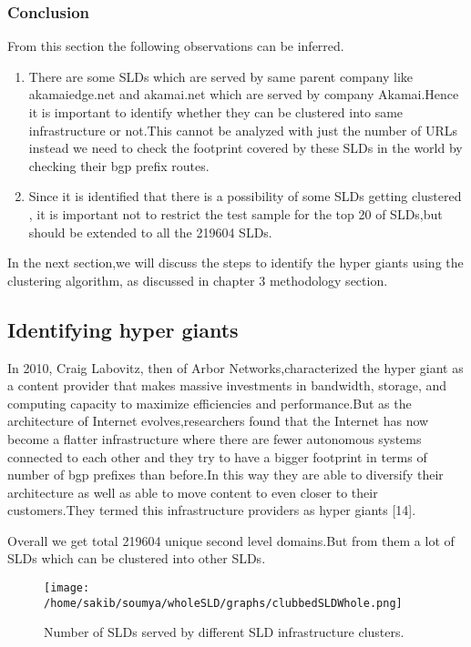 \subsubsection{Conclusion}
From this section the following observations can be inferred.
\begin{enumerate}
\item There are some SLDs which are served by same parent company like akamaiedge.net and akamai.net which are served by company Akamai.Hence it is important to identify whether they can be clustered into same infrastructure or not.This cannot be analyzed with just the number of URLs instead we need to check the footprint covered by these SLDs in the world by checking their bgp prefix routes. 
\item Since it is identified that there is a possibility of some SLDs getting clustered , it is important not to restrict the test sample for the top 20 of SLDs,but should be extended to all the 219604 SLDs.
\end{enumerate}
In the next section,we will discuss the steps to identify the hyper giants using the clustering algorithm, as discussed in chapter 3 methodology section.
\subsection{Identifying hyper giants}
In 2010, Craig Labovitz, then of Arbor Networks,characterized the hyper giant as a content provider that makes massive investments in bandwidth, storage, and computing capacity to maximize efficiencies and performance.But as the architecture of Internet evolves,researchers found that the Internet has now become a flatter infrastructure where there are fewer autonomous systems connected to each other and they try to have a bigger footprint in terms of number of bgp prefixes than before.In this way they are able to diversify their architecture as well as able to move content to even closer to their customers.They termed this infrastructure providers as hyper giants [14].

Overall we get total 219604 unique second level domains.But from them a lot of SLDs which can be clustered into other SLDs.

\begin{figure}[h]
\texttt{[image: /home/sakib/soumya/wholeSLD/graphs/clubbedSLDWhole.png]}
\centering
\caption{Number of SLDs served by different SLD infrastructure clusters.}
\end{figure}

